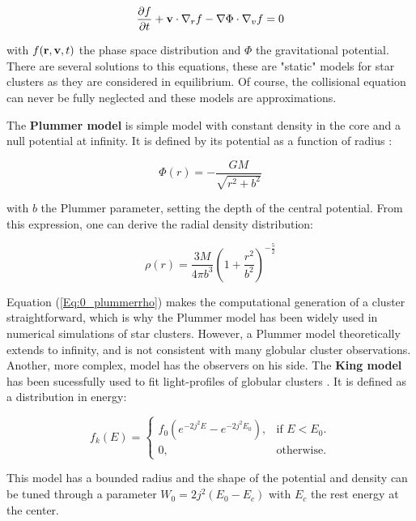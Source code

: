 \begin{equation}
\frac{\partial f}{\partial t} + \bold{v} \cdot \nabla_r f - \nabla \Phi \cdot \nabla_v f = 0
\end{equation}

with $f(\bold{r},\bold{v},t)$ the phase space distribution and $\Phi$ the gravitational potential. There are several solutions to this equations, these are "static" models for star clusters as they are considered in equilibrium. Of course, the collisional equation can never be fully neglected and these models are approximations. 

The \textbf{Plummer model} is simple model with constant density in the core and a null potential at infinity. It is defined by its potential as a function of radius \citep{BT}:

\begin{equation}
\Phi(r) = - \frac{G M}{\sqrt{r^2 + b^2}}
\end{equation}

with $b$ the Plummer parameter, setting the depth of the central potential. From this expression, one can derive the radial density distribution:

\begin{equation}
\label{Eq:0_plummerrho}
\rho(r) = \frac{3 M}{4 \pi b^3} \left( 1 + \frac{r^2}{b^2} \right) ^{- \frac{5}{2}}
\end{equation}

Equation (\ref{Eq:0_plummerrho}) makes the computational generation of a cluster straightforward, which is why the Plummer model has been widely used in numerical simulations of star clusters.
However, a Plummer model theoretically extends to infinity, and is not consistent with many globular cluster observations. Another, more complex, model has the observers on his side. The \textbf{King model} has been sucessfully used to fit light-profiles of globular clusters \citep{King1981}. It is defined as a distribution in energy:

\begin{equation}
  f_k(E)=\begin{cases}
    f_0 \left(e^{-2j^2E} - e^{-2j^2E_0}\right)  , & \text{if $E<E_0$}.\\
    0, & \text{otherwise}.
  \end{cases}
\end{equation}

This model has a bounded radius and the shape of the potential and density can be tuned through a parameter $W_0 =2j^2(E_0 - E_c)$ with $E_c$ the rest energy at the center. 


